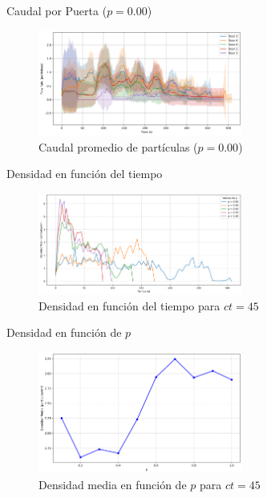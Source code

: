 \documentclass[aspectratio=169]{beamer}
\begin{document}
\begin{frame}{Caudal por Puerta ($p=0.00$)}
    \begin{figure}
        \centering
        \includegraphics[width=0.6\textwidth]{img/door_flow_rates_t_20_&_p_0.00.png}
        \caption{Caudal promedio de partículas ($p=0.00$)}
    \end{figure}
\end{frame}


\begin{frame}{Densidad en función del tiempo}
    \begin{figure}
        \centering
        \includegraphics[width=0.6\textwidth]{img/density_vs_time_t45.png}
        \caption{Densidad en función del tiempo para $ct = 45$}
        \label{fig:flow_p100}
    \end{figure}
\end{frame}

\begin{frame}{Densidad en función de $p$}
    \begin{figure}
        \centering
        \includegraphics[width=0.6\textwidth]{img/average_density_t45.png}
        \caption{Densidad media en función de $p$ para $ct=45$}
    \end{figure}
\end{frame}
\end{document}
